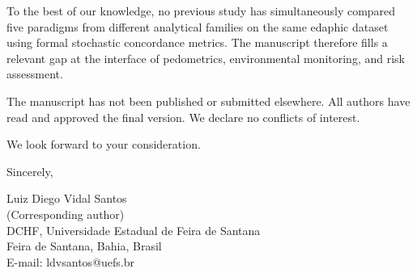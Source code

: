 \documentclass[12pt,a4paper]{article}
\begin{document}
\medskip

\noindent
To the best of our knowledge, no previous study has simultaneously compared five paradigms from different analytical families on the same edaphic dataset using formal stochastic concordance metrics. The manuscript therefore fills a relevant gap at the interface of pedometrics, environmental monitoring, and risk assessment.

\medskip

\noindent
The manuscript has not been published or submitted elsewhere. All authors have read and approved the final version. We declare no conflicts of interest.

\bigskip

\noindent
We look forward to your consideration.

\bigskip

\noindent
Sincerely,

\bigskip\bigskip

\noindent
Luiz Diego Vidal Santos\\
(Corresponding author)\\
DCHF, Universidade Estadual de Feira de Santana\\
Feira de Santana, Bahia, Brasil\\
E-mail: ldvsantos@uefs.br
\end{document}
